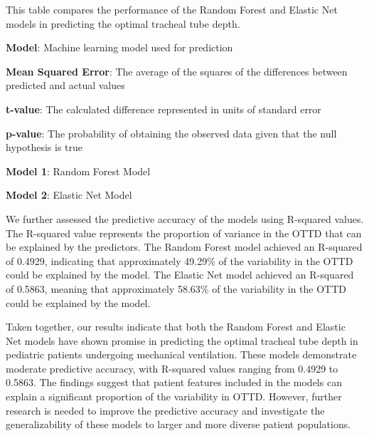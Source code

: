 \documentclass[11pt]{article}
\begin{document}
\begin{table}[h]
\caption{Comparison of Mean Squared Errors of the Models}
\label{table:comparison_models}
\begin{threeparttable}
\renewcommand{\TPTminimum}{\linewidth}
\begin{tablenotes}
\footnotesize
\item This table compares the performance of the Random Forest and Elastic Net models in predicting the optimal tracheal tube depth.
\item \textbf{Model}: Machine learning model used for prediction
\item \textbf{Mean Squared Error}: The average of the squares of the differences between predicted and actual values
\item \textbf{t-value}: The calculated difference represented in units of standard error
\item \textbf{p-value}: The probability of obtaining the observed data given that the null hypothesis is true
\item \textbf{Model 1}: Random Forest Model
\item \textbf{Model 2}: Elastic Net Model
\end{tablenotes}
\end{threeparttable}
\end{table}


We further assessed the predictive accuracy of the models using R-squared values. The R-squared value represents the proportion of variance in the OTTD that can be explained by the predictors. The Random Forest model achieved an R-squared of 0.4929, indicating that approximately 49.29\% of the variability in the OTTD could be explained by the model. The Elastic Net model achieved an R-squared of 0.5863, meaning that approximately 58.63\% of the variability in the OTTD could be explained by the model.

Taken together, our results indicate that both the Random Forest and Elastic Net models have shown promise in predicting the optimal tracheal tube depth in pediatric patients undergoing mechanical ventilation. These models demonstrate moderate predictive accuracy, with R-squared values ranging from 0.4929 to 0.5863. The findings suggest that patient features included in the models can explain a significant proportion of the variability in OTTD. However, further research is needed to improve the predictive accuracy and investigate the generalizability of these models to larger and more diverse patient populations.
\end{document}

